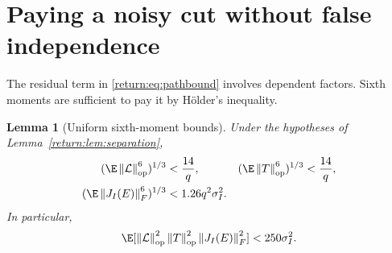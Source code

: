 \documentclass[11pt,oneside,openany,a4paper]{book}
\numberwithin{equation}{chapter}
\newtheorem{lemma}[theorem]{Lemma}
\theoremstyle{definition}
\theoremstyle{remark}
\newcommand{\F}[1]{\left\lVert#1\right\rVert_F}
\newcommand{\op}[1]{\left\lVert#1\right\rVert_{\rm op}}
\begin{document}
\section{Paying a noisy cut without false independence}
The residual term in \eqref{return:eq:pathbound} involves dependent factors. Sixth moments are sufficient to pay it by H\"older's inequality.

\begin{lemma}[Uniform sixth-moment bounds]\label{return:lem:six}
Under the hypotheses of Lemma~\ref{return:lem:separation},
\begin{align}
 (\E\op{\mathcal L}^{6})^{1/3}&<\frac{14}{q},&
 (\E\op T^{6})^{1/3}&<\frac{14}{q},\label{return:eq:inverse6}\\
 (\E\F{J_I(E)}^{6})^{1/3}&<1.26q^2\sigma_I^2.\label{return:eq:J6}
\end{align}
In particular,
\begin{equation}\label{return:eq:holder}
 \E[\op{\mathcal L}^2\op T^2\F{J_I(E)}^2]<250\sigma_I^2.
\end{equation}
\end{lemma}
\end{document}
